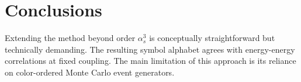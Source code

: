 \section{Conclusions}\label{sec:conclusions}

Extending the method beyond order $\alpha_s^3$ is conceptually
straightforward but technically demanding. The resulting symbol alphabet
agrees with energy-energy correlations at fixed coupling. The main
limitation of this approach is its reliance on color-ordered Monte Carlo
event generators.

